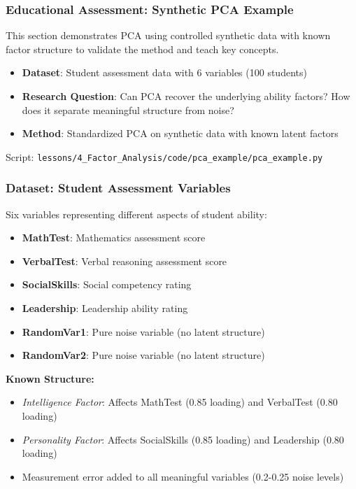 \documentclass[aspectratio=169]{beamer}
\begin{document}
\begin{frame}
    \frametitle{Educational Assessment: Synthetic PCA Example}
    This section demonstrates PCA using controlled synthetic data with known factor structure to validate the method and teach key concepts.
    \begin{itemize}
        \item \textbf{Dataset}: Student assessment data with 6 variables (100 students) \pause
        \item \textbf{Research Question}: Can PCA recover the underlying ability factors? How does it separate meaningful structure from noise? \pause
        \item \textbf{Method}: Standardized PCA on synthetic data with known latent factors \pause
    \end{itemize}
    \vspace{6pt}
    Script: \texttt{lessons/4\_Factor\_Analysis/code/pca\_example/pca\_example.py}
\end{frame}

\begin{frame}
    \frametitle{Dataset: Student Assessment Variables}
    Six variables representing different aspects of student ability:
    \begin{itemize}
        \item \textbf{MathTest}: Mathematics assessment score \pause
        \item \textbf{VerbalTest}: Verbal reasoning assessment score \pause
        \item \textbf{SocialSkills}: Social competency rating \pause
        \item \textbf{Leadership}: Leadership ability rating \pause
    \end{itemize}
    \vspace{6pt}
    \begin{itemize}
        \item \textbf{RandomVar1}: Pure noise variable (no latent structure) \pause
        \item \textbf{RandomVar2}: Pure noise variable (no latent structure) \pause
    \end{itemize}
    \vspace{12pt}
    \textbf{Known Structure:}
    \begin{itemize}
        \item \textit{Intelligence Factor}: Affects MathTest (0.85 loading) and VerbalTest (0.80 loading) \pause
        \item \textit{Personality Factor}: Affects SocialSkills (0.85 loading) and Leadership (0.80 loading) \pause
        \item Measurement error added to all meaningful variables (0.2-0.25 noise levels) \pause
    \end{itemize}
\end{frame}
\end{document}
